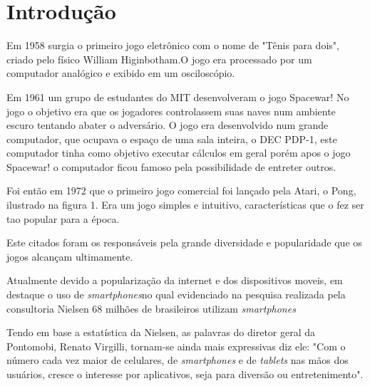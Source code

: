 \chapter{Introdução}
\label{cap:introducao}
 
 
Em 1958 surgia o primeiro jogo eletrônico com o nome de "Tênis para dois", criado pelo físico William Higinbotham.O jogo era processado por um computador analógico e exibido em um osciloscópio.
\cite{mass}


Em 1961 um grupo de estudantes do MIT desenvolveram o jogo Spacewar! No jogo o objetivo era que os jogadores controlassem suas naves num ambiente escuro tentando abater o adversário. O jogo era desenvolvido num grande computador, que ocupava o espaço de uma sala inteira, o DEC PDP-1, este computador tinha como objetivo executar cálculos em geral porém apos o jogo Spacewar! o computador ficou famoso pela possibilidade de entreter outros. \cite{ram}


Foi então em 1972 que o primeiro jogo comercial foi lançado pela Atari, o Pong, ilustrado na figura 1. Era um jogo simples e intuitivo, características que o fez ser tao popular para a época. \cite{tracc} 

\begin{figure}[h!]
		\centering
	\end{figure}


Este citados foram os responsáveis pela grande diversidade e popularidade que os jogos alcançam ultimamente.

Atualmente devido a popularização da internet e dos dispositivos moveis, em destaque o uso de \textit{smartphones}no qual evidenciado na pesquisa realizada pela consultoria Nielsen 68 milhões de brasileiros utilizam \textit{smartphones} \cite{nie} 

Tendo em base a estatística da Nielsen, as palavras do diretor geral da Pontomobi, Renato Virgilli, tornam-se ainda mais expressivas diz ele: "Com o número cada vez maior de celulares, de \textit{smartphones} e de \textit{tablets} nas mãos dos usuários, cresce o interesse por aplicativos, seja para diversão ou entretenimento". \cite{vir}


